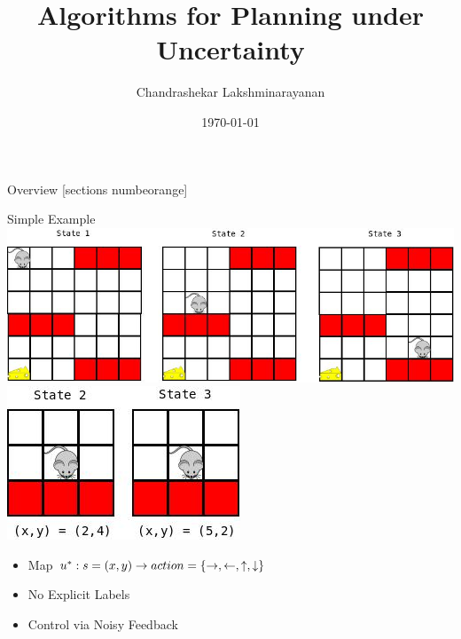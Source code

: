 \documentclass[10pt]{beamer}
\title{Algorithms for Planning under Uncertainty}
\date{\today}
\author{Chandrashekar Lakshminarayanan}
\institute{Reinforcement Learning \& Artifical Intelligence Group,\\University of Alberta}
\begin{document}
\maketitle

\begin{frame}{Overview}
  [sections numbeorange]
  \tableofcontents[hideallsubsections]
\end{frame}

\begin{frame}[fragile]{Simple Example}
\includegraphics[scale=0.25]{mouse-allo.jpeg}
\includegraphics[scale=0.25]{mouse-states2.jpeg}
\color{black}
\begin{block}{}
\begin{itemize}
\item Map $u^*: s=(x,y)\rightarrow action=\{\rightarrow,\leftarrow,\uparrow,\downarrow\}$
\item No Explicit Labels
\item Control via Noisy Feedback
\end{itemize}
\end{block}
\end{frame}
\end{document}
